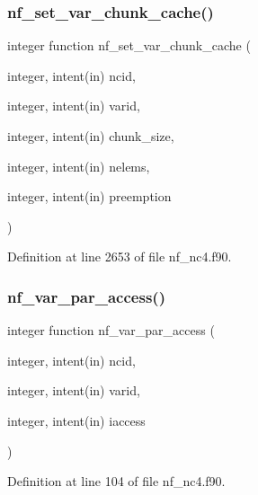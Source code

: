 \subsubsection{\texorpdfstring{nf\+\_\+set\+\_\+var\+\_\+chunk\+\_\+cache()}{nf\_set\_var\_chunk\_cache()}}
{\footnotesize\ttfamily integer function nf\+\_\+set\+\_\+var\+\_\+chunk\+\_\+cache (\begin{DoxyParamCaption}\item[{integer, intent(in)}]{ncid,  }\item[{integer, intent(in)}]{varid,  }\item[{integer, intent(in)}]{chunk\+\_\+size,  }\item[{integer, intent(in)}]{nelems,  }\item[{integer, intent(in)}]{preemption }\end{DoxyParamCaption})}



Definition at line 2653 of file nf\+\_\+nc4.\+f90.

\mbox{\label{nf__nc4_8f90_a918cdfbb2e46c4d138b0fe1deda0fabb}} 
\subsubsection{\texorpdfstring{nf\+\_\+var\+\_\+par\+\_\+access()}{nf\_var\_par\_access()}}
{\footnotesize\ttfamily integer function nf\+\_\+var\+\_\+par\+\_\+access (\begin{DoxyParamCaption}\item[{integer, intent(in)}]{ncid,  }\item[{integer, intent(in)}]{varid,  }\item[{integer, intent(in)}]{iaccess }\end{DoxyParamCaption})}



Definition at line 104 of file nf\+\_\+nc4.\+f90.

